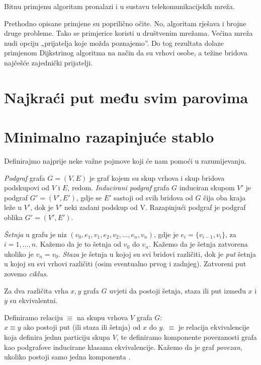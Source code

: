 \documentclass[10pt]{scrartcl}
\begin{document}
Bitnu primjenu algoritam pronalazi i u sustavu telekomunikacijskih mreža.

Prethodno opisane primjene su poprilično očite. No, algoritam rješava i brojne druge probleme. 
Tako se primjerice koristi u društvenim mrežama. Većina mreža nudi opciju „prijatelja koje možda poznajemo”. Do tog rezultata dolaze primjenom Dijkstrinog algoritma na način da su vrhovi osobe, a težine bridova najčešće zajednički prijatelji.





\section{Najkraći put među svim parovima}
\section{Minimalno razapinjuće stablo}

Definirajmo najprije neke važne pojmove koji će nam pomoći u razumijevanju. 

\begin{definicija}
\emph{Podgraf} grafa $G = (V,E)$ je graf kojem su skup vrhova i skup bridova podskupovi od $V$ i $E$, redom. \emph{Inducirani podgraf} grafa $G$ induciran skupom $V'$ je podgraf $G' = (V', E')$, gdje se $E'$ sastoji od svih bridova od $G$ čija oba kraja leže u $V'$, dok je $V'$ neki zadani podskup od V. Razapinjući podgraf je podgraf oblika $G' = (V', E')$. 
\end{definicija}

\begin{definicija}
\emph{Šetnja} u grafu je niz $(v_0, e_1, v_1, e_2, v_2,\dotsc,e_n, v_n)$, gdje je $e_i = \{v_{i-1}, v_i\}$, 
za $i = 1,\dotsc,n$. Kažemo da je to šetnja od $v_0$ do $v_n$. Kažemo da je šetnja zatvorena ukoliko je $v_n = v_0$.
\emph{Staza} je šetnja u kojoj su svi bridovi različiti, dok je \emph{put} šetnja u kojoj su svi vrhovi različiti (osim
eventualno prvog i zadnjeg). Zatvoreni put zovemo \emph{ciklus}.
\end{definicija}

\begin{propozicija}
Za dva različita vrha $x,y$ grafa $G$ uvjeti da postoji šetnja, staza ili put između $x$ i $y$ su ekvivalentni.
\end{propozicija}

\begin{definicija}
Definiramo relaciju $\equiv$ na skupu vrhova $V$ grafa $G$: \\
$x \equiv y$ ako postoji put (ili staza ili šetnja) od $x$ do $y$. $\equiv$ je relacija ekvivalencije koja definira jednu particiju skupa $V$, te definiramo komponente povezanosti grafa kao podgrafove inducirane klasama ekvivalencije. Kažemo da je graf \emph{povezan}, ukoliko postoji samo jedna komponenta .
\end{definicija}
\end{document}
